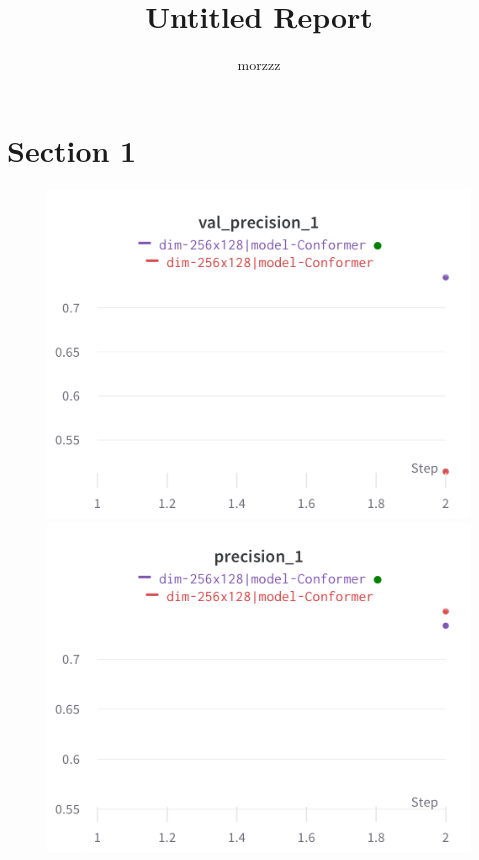 \documentclass{article}
\title{Untitled Report}
\author{%
morzzz
}
\begin{document}
\maketitle

\section{Section 1}

\begin{figure}[!htb]
\includegraphics[width=\linewidth]{charts/Section-2-Panel-0-m3z2rjxo3}
\caption{}
\endminipage\hfill
{}
\includegraphics[width=\linewidth]{charts/Section-2-Panel-1-fpn690bf4}
\caption{}
\endminipage
\end{figure}
\end{document}
